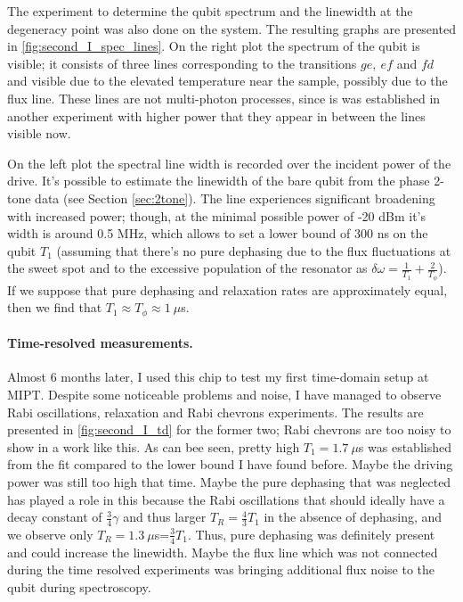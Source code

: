 \documentclass[12pt, twoside]{report}
\numberwithin{equation}{section}
\begin{document}
The experiment to determine the qubit spectrum and the linewidth at the degeneracy point was also done on the system. The resulting graphs are presented in \autoref{fig:second_I_spec_lines}. On the right plot the spectrum of the qubit is visible; it consists of three lines corresponding to the transitions $ge,\ ef$ and $fd$ and visible due to the elevated temperature near the sample, possibly due to the flux line. These lines are not multi-photon processes, since is was established in another experiment with higher power that they appear in between the lines visible now. 

On the left plot the spectral line width is recorded over the incident power of the drive. It's possible to estimate the linewidth of the bare qubit from the phase 2-tone data (see Section \ref{sec:2tone}). The line experiences significant broadening with increased power; though, at the minimal possible power of -20 dBm it's width is around 0.5 MHz, which allows to set a lower bound of 300 ns on the qubit $T_1$ (assuming that there's no pure dephasing due to the flux fluctuations at the sweet spot and to the excessive population of the resonator as $\delta\omega = \frac{1}{T_1}+\frac{2}{T_\phi}$). If we suppose that pure dephasing and relaxation rates are approximately equal, then we find that $T_1\approx T_\phi \approx 1\ \mu$s.


\paragraph{Time-resolved measurements.} Almost 6 months later, I used this chip to test my first time-domain setup at MIPT. Despite some noticeable problems and noise, I have managed to observe Rabi oscillations, relaxation and Rabi chevrons experiments. The results are presented in \autoref{fig:second_I_td} for the former two; Rabi chevrons are too noisy to show in a work like this. As can bee seen, pretty high $T_1=1.7\ \mu$s was established from the fit compared to the lower bound I have found before. Maybe the driving power was still too high that time. Maybe the pure dephasing that was neglected has played a role in this because the Rabi oscillations that should ideally have a decay constant of $\frac{3}{4}\gamma$ and thus larger $T_R = \frac{4}{3} T_1$ in the absence of dephasing, and we observe only $T_R=1.3\ \mu$s=$\frac{3}{4} T_1$. Thus, pure dephasing was definitely present and could increase the linewidth. Maybe the flux line which was not connected during the time resolved experiments was bringing additional flux noise to the qubit during spectroscopy.
\end{document}
